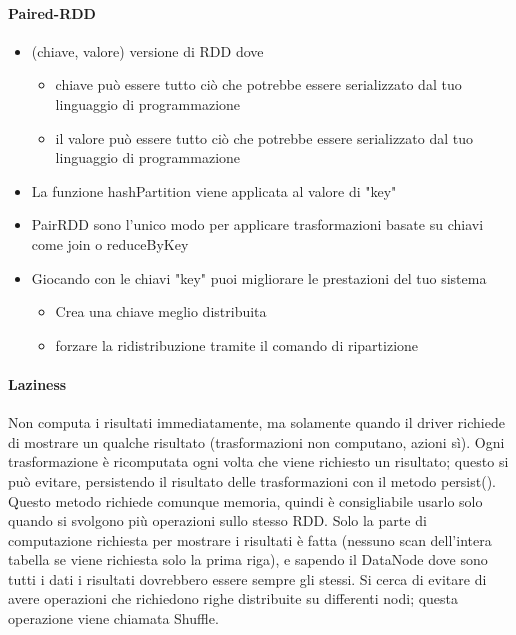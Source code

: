 \documentclass{article}
\begin{document}
\paragraph{Paired-RDD}
\begin{itemize}
    \item (chiave, valore) versione di RDD dove
    \begin{itemize}
        \item chiave può essere tutto ciò che potrebbe essere serializzato dal tuo linguaggio di programmazione
        \item il valore può essere tutto ciò che potrebbe essere serializzato dal tuo linguaggio di programmazione
    \end{itemize}
    \item La funzione hashPartition viene applicata al valore di "key"
    \item PairRDD sono l'unico modo per applicare trasformazioni basate su chiavi come join o reduceByKey
    \item Giocando con le chiavi "key" puoi migliorare le prestazioni del tuo sistema
    \begin{itemize}
        \item Crea una chiave meglio distribuita
        \item forzare la ridistribuzione tramite il comando di ripartizione
    \end{itemize}
\end{itemize}
\paragraph{Laziness}
Non computa i risultati immediatamente, ma solamente quando il driver richiede di mostrare un qualche risultato (trasformazioni non computano, azioni sì).
Ogni trasformazione è ricomputata ogni volta che viene richiesto un risultato; questo si può evitare, persistendo il risultato delle trasformazioni con il metodo persist(). Questo metodo richiede comunque memoria, quindi è consigliabile usarlo solo quando si svolgono più operazioni sullo stesso RDD.
Solo la parte di computazione richiesta per mostrare i risultati è fatta (nessuno scan dell’intera tabella se viene richiesta solo la prima riga), e sapendo il DataNode dove sono tutti i dati i risultati dovrebbero essere sempre gli stessi.
Si cerca di evitare di avere operazioni che richiedono righe distribuite su differenti nodi; questa operazione viene chiamata Shuffle.
\end{document}
